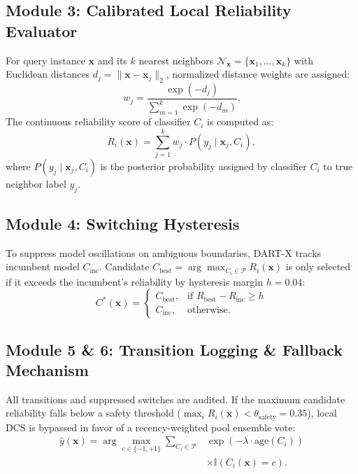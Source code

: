 \documentclass[conference,10pt]{IEEEtran}
\begin{document}
\subsection{Module 3: Calibrated Local Reliability Evaluator}
For query instance $\mathbf{x}$ and its $k$ nearest neighbors $\mathcal{N}_{\mathbf{x}} = \{\mathbf{x}_1, \dots, \mathbf{x}_k\}$ with Euclidean distances $d_j = \|\mathbf{x} - \mathbf{x}_j\|_2$, normalized distance weights are assigned:
\begin{equation}
    w_j = \frac{\exp(-d_j)}{\sum_{m=1}^k \exp(-d_m)}.
\end{equation}
The continuous reliability score of classifier $C_i$ is computed as:
\begin{equation}
    R_i(\mathbf{x}) = \sum_{j=1}^k w_j \cdot P(y_j \mid \mathbf{x}_j, C_i),
\end{equation}
where $P(y_j \mid \mathbf{x}_j, C_i)$ is the posterior probability assigned by classifier $C_i$ to true neighbor label $y_j$.

\subsection{Module 4: Switching Hysteresis}
To suppress model oscillations on ambiguous boundaries, DART-X tracks incumbent model $C_{\text{inc}}$. Candidate $C_{\text{best}} = \arg\max_{C_i \in \mathcal{P}} R_i(\mathbf{x})$ is only selected if it exceeds the incumbent's reliability by hysteresis margin $h = 0.04$:
\begin{equation}
    C^*(\mathbf{x}) = \begin{cases}
        C_{\text{best}}, & \text{if } R_{\text{best}} - R_{\text{inc}} \ge h \\
        C_{\text{inc}}, & \text{otherwise}.
    \end{cases}
\end{equation}

\subsection{Module 5 \& 6: Transition Logging \& Fallback Mechanism}
All transitions and suppressed switches are audited. If the maximum candidate reliability falls below a safety threshold ($\max_i R_i(\mathbf{x}) < \theta_{\text{safety}} = 0.35$), local DCS is bypassed in favor of a recency-weighted pool ensemble vote:
\begin{equation}
\begin{aligned}
    \hat{y}(\mathbf{x}) = \arg\max_{c \in \{-1, +1\}} \sum_{C_i \in \mathcal{P}} & \exp\left(-\lambda \cdot \text{age}(C_i)\right) \\
    & \times \mathbb{I}\left(C_i(\mathbf{x}) = c\right).
\end{aligned}
\end{equation}
\end{document}
